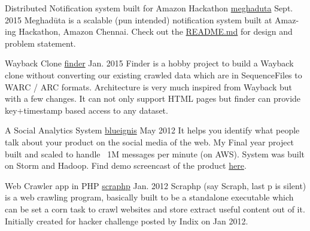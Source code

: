 \begin{cventries}
  \cventry
    {Distributed Notification system built for Amazon Hackathon} %
    {\href{https://github.com/ashwanthkumar/meghaduta}{meghaduta}} %
    {Sept. 2015} %
    {} %
    {
    Meghadūta is a scalable (pun intended) notification system built at Amaz-ing Hackathon, Amazon Chennai.
    Check out the \href{https://github.com/ashwanthkumar/meghaduta/blob/master/README.md}{README.md} for design and problem statement.
    }

  \cventry
    {Wayback Clone} %
    {\href{https://github.com/ashwanthkumar/finder}{finder}} %
    {Jan. 2015} %
    {} %
    {
    Finder is a hobby project to build a Wayback clone without converting our existing crawled data which are in SequenceFiles to WARC / ARC formats.
    Architecture is very much inspired from Wayback but with a few changes. It can not only support HTML pages but finder can provide key+timestamp based access to any dataset.
    }

  \cventry
    {A Social Analytics System} %
    {\href{http://blog.ashwanthkumar.in/2012/05/blueignis-feature-screencast-closed.html}{blueignis}} %
    {May 2012} %
    {} %
    {
    It helps you identify what people talk about your product on the social media of the web.
    My Final year project built and scaled to handle ~1M messages per minute (on AWS). System was built on Storm and Hadoop.
    Find demo screencast of the product \href{http://blog.ashwanthkumar.in/2012/05/blueignis-feature-screencast-closed.html}{here}.
    }

  \cventry
    {Web Crawler app in PHP} %
    {\href{https://github.com/ashwanthkumar/scraphp}{scraphp}} %
    {Jan. 2012} %
    {} %
    {
    Scraphp (say Scraph, last p is silent) is a web crawling program, basically built to be a standalone executable which can be set a corn task to crawl websites and store extract useful content out of it.
    Initially created for hacker challenge posted by Indix on Jan 2012.
    }

\end{cventries}
